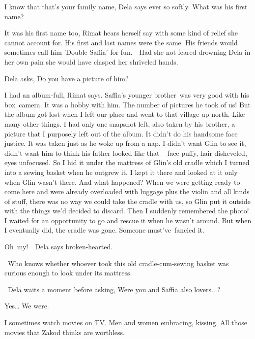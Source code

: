 \documentclass[letterpaper]{article}
\begin{document}
{\textquotedbl}I know that that's your family name,{\textquotedbl} Dela says ever so softly. {\textquotedbl}What was his
first name?{\textquotedbl} 

{\textquotedbl}It was his first name too,{\textquotedbl} Rimat hears herself say with some kind of relief she cannot
account for. {\textquotedbl}His first and last names were the same. His friends would sometimes call him 'Double
Saffia' for fun.{\textquotedbl}\ \ Had she not feared drowning Dela in her own pain she would have clasped her
shriveled hands.\ 

Dela asks, {\textquotedbl}Do you have a picture of him?{\textquotedbl}

{\textquotedbl}I had an album-full,{\textquotedbl} Rimat says. {\textquotedbl}Saffia's younger brother~was very good
with his box~camera. It was a hobby with him.  The number of pictures he took of us! But the album got lost when I left
our place and went to that village up north. Like many other things. I had only one snapshot left, also taken by his
brother, a picture that I purposely left out of the album. It didn't do his handsome face justice. It was taken just as
he woke up from a nap. I didn't want Glin to see it, didn't want him to think his father looked like that -- face
puffy, hair disheveled, eyes unfocused. So I hid it under the mattress of Glin's old cradle which I turned into a
sewing basket when he outgrew it. I kept it there and looked at it only when Glin wasn't there. And what happened? When
we were getting ready to come here and were already overloaded with luggage plus the violin and all kinds of stuff,
there was no way we could take the cradle with us, so Glin put it outside with the things we'd decided to discard. Then
I suddenly remembered the photo! I waited for an opportunity to go and rescue it when he wasn't around. But when I
eventually did, the cradle was gone. Someone must've~fancied it.{\textquotedbl}

{\textquotedbl}Oh\ my!{\textquotedbl}\ \ Dela says broken{}-hearted. 

~{\textquotedbl}Who knows whether whoever took this old cradle-cum-sewing basket was curious enough to look under its
mattress.{\textquotedbl}

~Dela waits a moment before asking, {\textquotedbl}Were you and Saffia also lovers...?{\textquotedbl}

{\textquotedbl}Yes{\dots} We were.{\textquotedbl}

{\textquotedbl}I sometimes watch movies on TV. Men and women embracing, kissing. All those movies that Zakod thinks are
worthless.{\textquotedbl}
\end{document}
